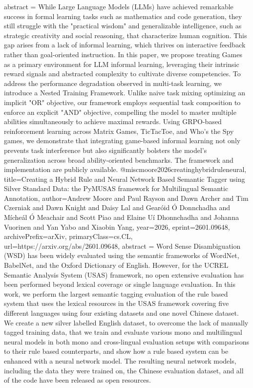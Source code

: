 {      abstract = {While Large Language Models (LLMs) have achieved remarkable success in formal learning tasks such as mathematics and code generation, they still struggle with the "practical wisdom" and generalizable intelligence, such as strategic creativity and social reasoning, that characterize human cognition. This gap arises from a lack of informal learning, which thrives on interactive feedback rather than goal-oriented instruction. In this paper, we propose treating Games as a primary environment for LLM informal learning, leveraging their intrinsic reward signals and abstracted complexity to cultivate diverse competencies. To address the performance degradation observed in multi-task learning, we introduce a Nested Training Framework. Unlike naive task mixing optimizing an implicit "OR" objective, our framework employs sequential task composition to enforce an explicit "AND" objective, compelling the model to master multiple abilities simultaneously to achieve maximal rewards. Using GRPO-based reinforcement learning across Matrix Games, TicTacToe, and Who's the Spy games, we demonstrate that integrating game-based informal learning not only prevents task interference but also significantly bolsters the model's generalization across broad ability-oriented benchmarks. The framework and implementation are publicly available.}
}@misc{moore2026creatinghybridruleneural,
      title={Creating a Hybrid Rule and Neural Network Based Semantic Tagger using Silver Standard Data: the PyMUSAS framework for Multilingual Semantic Annotation}, 
      author={Andrew Moore and Paul Rayson and Dawn Archer and Tim Czerniak and Dawn Knight and Daisy Lal and Gearóid Ó Donnchadha and Mícheál Ó Meachair and Scott Piao and Elaine Uí Dhonnchadha and Johanna Vuorinen and Yan Yabo and Xiaobin Yang},
      year={2026},
      eprint={2601.09648},
      archivePrefix={arXiv},
      primaryClass={cs.CL},
      url={https://arxiv.org/abs/2601.09648},
      abstract = {Word Sense Disambiguation (WSD) has been widely evaluated using the semantic frameworks of WordNet, BabelNet, and the Oxford Dictionary of English. However, for the UCREL Semantic Analysis System (USAS) framework, no open extensive evaluation has been performed beyond lexical coverage or single language evaluation. In this work, we perform the largest semantic tagging evaluation of the rule based system that uses the lexical resources in the USAS framework covering five different languages using four existing datasets and one novel Chinese dataset. We create a new silver labelled English dataset, to overcome the lack of manually tagged training data, that we train and evaluate various mono and multilingual neural models in both mono and cross-lingual evaluation setups with comparisons to their rule based counterparts, and show how a rule based system can be enhanced with a neural network model. The resulting neural network models, including the data they were trained on, the Chinese evaluation dataset, and all of the code have been released as open resources.}
}
